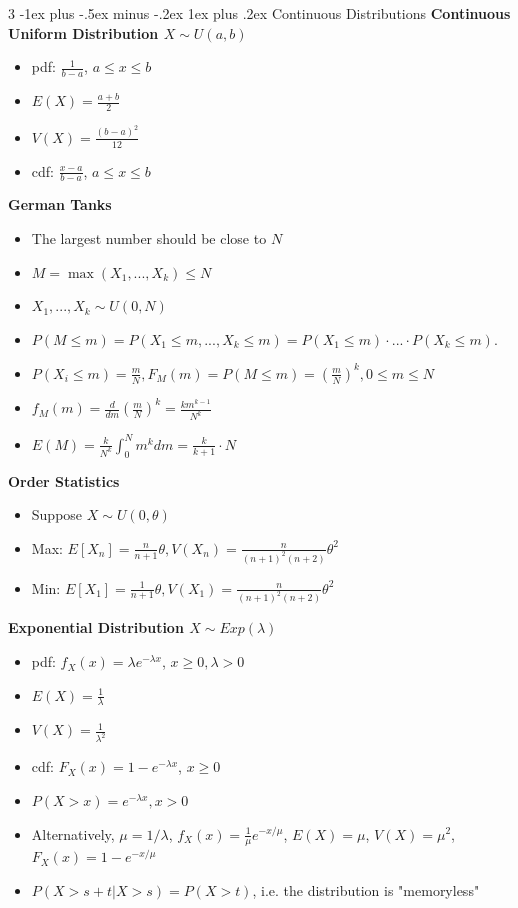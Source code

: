 \documentclass[10pt, landscape]{article}
\makeatletter
\renewcommand{\subsection}{\@startsection{subsection}{3}{0mm}%
                                {-1ex plus -.5ex minus -.2ex}%
                                {1ex plus .2ex}%
                                {\normalfont\small\bfseries}}%
\makeatother
\begin{document}
\begin{multicols*}{3}
\subsection{Continuous Distributions}
\textbf{Continuous Uniform Distribution $X\sim U(a, b)$}
\begin{itemize}
    \item pdf: $\frac{1}{b-a}$, $a \leq x \leq b$
    \item $E(X)=\frac{a+b}{2}$
    \item $V(X)=\frac{(b-a)^2}{12}$
    \item cdf: $\frac{x-a}{b-a}$, $a \leq x \leq b$
\end{itemize}

\textbf{German Tanks}
\begin{itemize}
    \item The largest number should be close to $N$
    \item $M = \max(X_1, ..., X_k) \leq N$
    \item $X_1,...,X_k \sim U(0, N)$
    \item $P(M \leq m) = P(X_1 \leq m, ..., X_k \leq m)=P(X_1 \leq m)\cdot...\cdot P(X_k \leq m)$.
    \item $P(X_i \leq m) = \frac{m}{N}, F_M(m) = P(M \leq m) = (\frac{m}{N})^k, 0 \leq m \leq N$
    \item $f_M(m)=\frac{d}{dm}(\frac{m}{N})^k=\frac{km^{k-1}}{N^k}$
    \item $E(M) = \frac{k}{N^k}\int_0^N m^k dm=\frac{k}{k+1}\cdot N$
\end{itemize}

\textbf{Order Statistics}
\begin{itemize}
    \item Suppose $X \sim U(0, \theta)$
    \item Max: $E[X_n]=\frac{n}{n+1}\theta, V(X_n) = \frac{n}{(n+1)^2(n+2)}\theta^2$
    \item Min: $E[X_1]=\frac{1}{n+1}\theta, V(X_1) = \frac{n}{(n+1)^2(n+2)}\theta^2$
\end{itemize}

\textbf{Exponential Distribution $X \sim Exp(\lambda)$}
\begin{itemize}
    \item pdf: $f_X(x)=\lambda e^{-\lambda x}$, $x \geq 0, \lambda > 0$
    \item $E(X)=\frac{1}{\lambda}$
    \item $V(X)=\frac{1}{\lambda^2}$
    \item cdf: $F_X(x)=1-e^{-\lambda x}$, $x \geq 0$
    \item $P(X>x)=e^{-\lambda x}, x > 0$
    \item Alternatively, $\mu=1/\lambda$, $f_X(x)=\frac{1}{\mu}e^{-x/\mu}$, $E(X)=\mu$, $V(X)=\mu^2$, $F_X(x)=1-e^{-x/\mu}$
    \item $P(X>s+t|X>s)=P(X>t)$, i.e. the distribution is "memoryless"
\end{itemize}


\end{multicols*}
\end{document}

